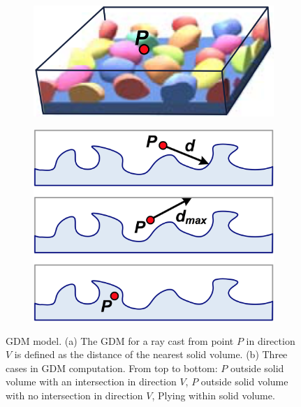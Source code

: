 \begin{figure}
\begin{center}
	\begin{subfigure}[b]{.48\textwidth}
		\includegraphics[width=1.0\textwidth]{graphics/df/GDM-model-1}	
		\caption{}
	\end{subfigure}
	\begin{subfigure}[b]{.48\textwidth}
		\includegraphics[width=1.0\textwidth]{graphics/df/GDM-model-2}	
		\caption{}
	\end{subfigure}
\end{center}	
\caption{GDM model. (a) The GDM for a ray cast from point $P$ in direction $V$ is defined as the distance of the nearest solid volume. (b) Three cases in GDM computation. From top to bottom: $P$ outside solid volume with an intersection in direction $V$, $P$ outside solid volume with no intersection in direction $V$, Plying within solid volume.}
\label{f:GDM-modelling}
\end{figure}

